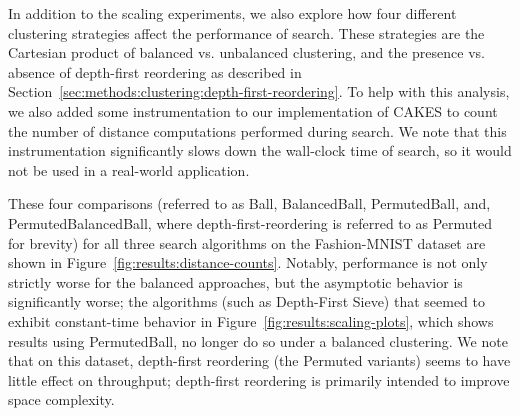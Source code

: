 In addition to the scaling experiments, we also explore how four different clustering strategies affect the performance of search.
These strategies are the Cartesian product of balanced vs. unbalanced clustering, and the presence vs. absence of depth-first reordering as described in Section~\ref{sec:methods:clustering:depth-first-reordering}.
To help with this analysis, we also added some instrumentation to our implementation of CAKES to count the number of distance computations performed during search.
We note that this instrumentation significantly slows down the wall-clock time of search, so it would not be used in a real-world application.

These four comparisons (referred to as Ball, BalancedBall, PermutedBall, and, PermutedBalancedBall, where depth-first-reordering is referred to as Permuted for brevity) for all three search algorithms on the Fashion-MNIST dataset are shown in Figure~\ref{fig:results:distance-counts}.
Notably, performance is not only strictly worse for the balanced approaches, but the asymptotic behavior is significantly worse;
the algorithms (such as Depth-First Sieve) that seemed to exhibit constant-time behavior in Figure~\ref{fig:results:scaling-plots}, which shows results using PermutedBall, no longer do so under a balanced clustering.
We note that on this dataset, depth-first reordering (the Permuted variants) seems to have little effect on throughput; depth-first reordering is primarily intended to improve space complexity.


